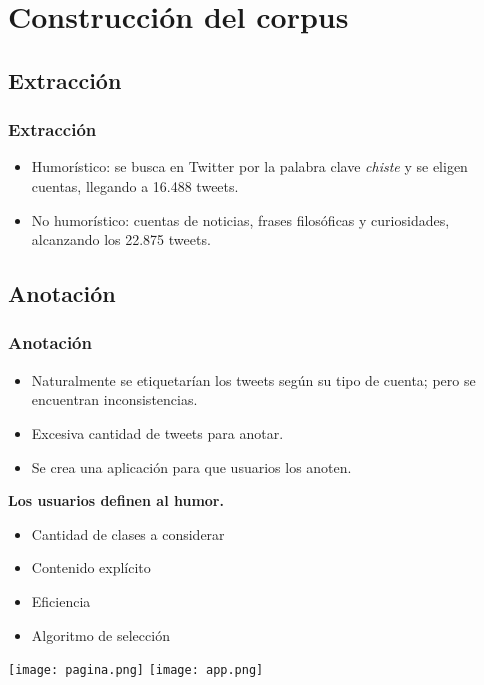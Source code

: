 \section{Construcción del corpus}

\subsection{Extracción}
\begin{frame}
    \frametitle{Extracción}

    \begin{itemize}
        \item Humorístico: se busca en Twitter por la palabra clave \emph{chiste} y se eligen cuentas, llegando a 16.488 tweets.
        \item No humorístico: cuentas de noticias, frases filosóficas y curiosidades, alcanzando los 22.875 tweets.
    \end{itemize}
\end{frame}

\subsection{Anotación}
\begin{frame}[allowframebreaks]
    \frametitle{Anotación}

    \begin{itemize}
        \item Naturalmente se etiquetarían los tweets según su tipo de cuenta; pero se encuentran inconsistencias.
        \item Excesiva cantidad de tweets para anotar.
        \item Se crea una aplicación para que usuarios los anoten.
    \end{itemize}

    \begin{center}
        \bf
        Los usuarios definen al humor.
    \end{center}

    \framebreak

    \begin{itemize}
        \item Cantidad de clases a considerar
        \item Contenido explícito
        \item Eficiencia
        \item Algoritmo de selección
    \end{itemize}

    \framebreak

    \begin{center}
        \texttt{[image: pagina.png]}
        \hspace{1cm}
        \texttt{[image: app.png]}
    \end{center}
\end{frame}

